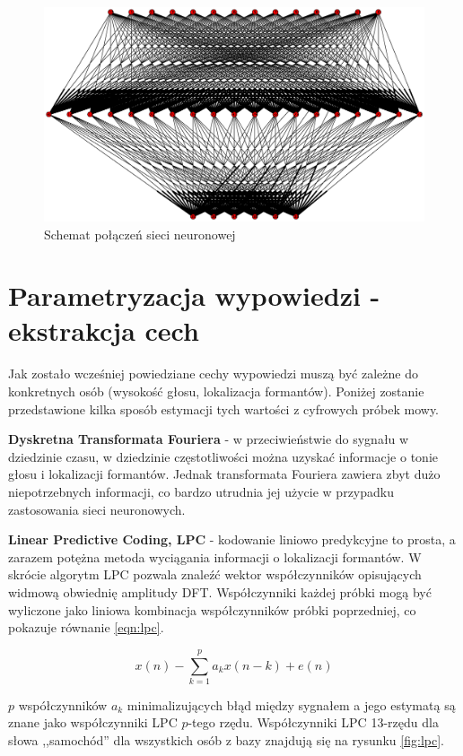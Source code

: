 \documentclass[a4paper]{article}
\begin{document}
\begin{figure}
    \includegraphics[width=\textwidth]{network}
    \caption{Schemat połączeń sieci neuronowej}
    \label{fig:network}
\end{figure}

\section{Parametryzacja wypowiedzi - ekstrakcja cech}

Jak zostało wcześniej powiedziane cechy wypowiedzi muszą być zależne do
konkretnych osób (wysokość głosu, lokalizacja formantów). Poniżej zostanie
przedstawione kilka sposób estymacji tych wartości z cyfrowych próbek mowy.

\textbf{Dyskretna Transformata Fouriera} - w przeciwieństwie do sygnału w
dziedzinie czasu, w dziedzinie częstotliwości można uzyskać informacje o tonie
głosu i lokalizacji formantów. Jednak transformata Fouriera zawiera zbyt dużo
niepotrzebnych informacji, co bardzo utrudnia jej użycie w przypadku
zastosowania sieci neuronowych.

\textbf{Linear Predictive Coding, LPC} - kodowanie liniowo predykcyjne to
prosta, a zarazem potężna metoda wyciągania informacji o lokalizacji formantów.
W skrócie algorytm LPC pozwala znaleźć wektor współczynników opisujących
widmową obwiednię amplitudy DFT. Współczynniki każdej próbki mogą być wyliczone
jako liniowa kombinacja współczynników próbki poprzedniej, co pokazuje równanie
\ref{eqn:lpc}.

\begin{equation}\label{eqn:lpc}
    x(n) - \sum_{k=1}^p a_k x(n-k) + e(n)
\end{equation}

$p$ współczynników $a_k$ minimalizujących błąd między sygnałem a jego estymatą
są znane jako współczynniki LPC $p$-tego rzędu. Współczynniki LPC 13-rzędu dla
słowa ,,samochód'' dla wszystkich osób z bazy znajdują się na rysunku
\ref{fig:lpc}.
\end{document}

